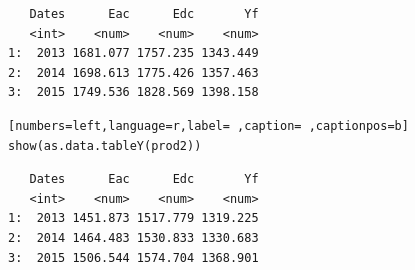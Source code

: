 \begin{verbatim}
   Dates      Eac      Edc       Yf
   <int>    <num>    <num>    <num>
1:  2013 1681.077 1757.235 1343.449
2:  2014 1698.613 1775.426 1357.463
3:  2015 1749.536 1828.569 1398.158
\end{verbatim}


\begin{lstlisting}[numbers=left,language=r,label= ,caption= ,captionpos=b]
show(as.data.tableY(prod2))
\end{lstlisting}

\begin{verbatim}
   Dates      Eac      Edc       Yf
   <int>    <num>    <num>    <num>
1:  2013 1451.873 1517.779 1319.225
2:  2014 1464.483 1530.833 1330.683
3:  2015 1506.544 1574.704 1368.901
\end{verbatim}

